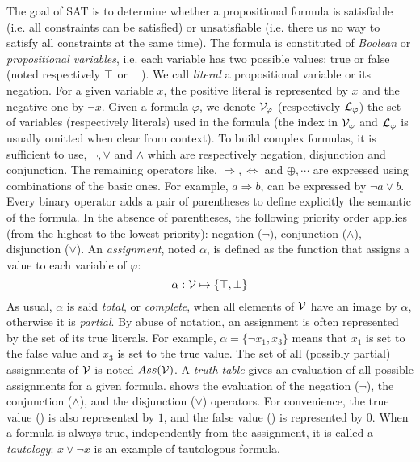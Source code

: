 The goal of SAT is to determine whether a propositional formula is satisfiable (i.e. all constraints can be satisfied)
or unsatisfiable (i.e. there us no way to satisfy all constraints at the same time).
The formula is constituted of \emph{Boolean} or \emph{propositional variables},
i.e. each variable has two possible values: true or false (noted respectively $\top$ or $\bot$).
We call \emph{literal} a propositional variable or its negation.
For a given variable $x$, the positive literal is represented by $x$ and the negative one by $\neg x$.
Given a formula $\varphi$, we denote $\mathcal{V}_\varphi$ (respectively $\mathcal{L}_\varphi$) the set of variables (respectively literals) used in the formula (the index in $\mathcal{V}_\varphi$ and $\mathcal{L}_\varphi$ is usually omitted when
clear from context).
To build complex formulas, it is sufficient to use, $\neg, \lor$ and $\land$ which are respectively negation, disjunction and conjunction. The remaining operators like, $\Rightarrow, \Leftrightarrow$ and
$\oplus, \cdots$ are expressed using combinations of the basic ones.
For example, $a \Rightarrow b$, can be expressed by $ \neg a \lor b$.
Every binary operator adds a pair of parentheses to define explicitly the semantic of the formula.
In the absence of parentheses, the following priority order applies (from the highest to the lowest priority):
negation ($\neg$), conjunction ($\land$), disjunction ($\lor$).
An \emph{assignment}, noted $\alpha$, is defined as the function that assigns a value to each variable of $\varphi$:
 $$\alpha: \mathcal{V} \mapsto \{ \top, \bot \}$$
 As usual, $\alpha$ is said \emph{total}, or \emph{complete}, when all elements of $\mathcal{V}$ have an image by
$\alpha$, otherwise it is \emph{partial}. By abuse of notation, an assignment is
often represented by the set of its true literals. For example, $\alpha = \{\neg x_1, x_3 \}$ means that $x_1$
is set to the false value and $x_3$ is set to the true value.
  The set of all (possibly partial) assignments of $\mathcal{V}$ is noted $Ass(\mathcal{V})$.
A \emph{truth table} gives an evaluation of all possible assignments for a given formula.
 shows the evaluation of the negation ($\neg$), the conjunction ($\land$), and the disjunction ($\lor$) operators.
For convenience, the true value (\true) is also represented by $1$, and the false value (\false) is represented by $0$.
When a formula is always true, independently from the assignment, it is called a \emph{tautology}: $x \lor \neg x$ is 
an example of tautologous formula.

